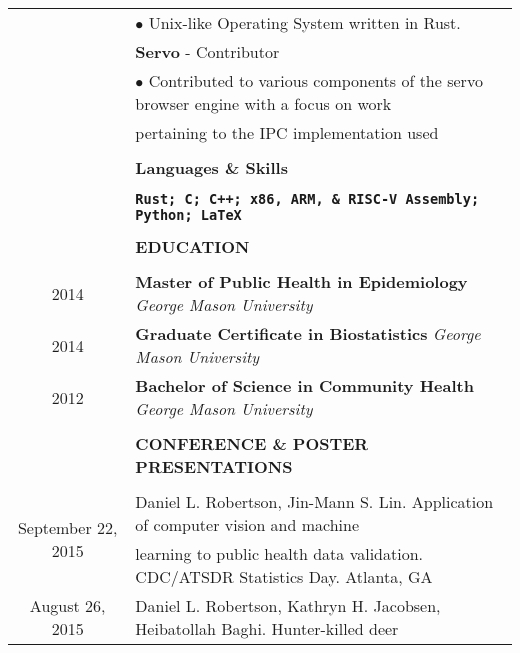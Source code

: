 \documentclass[10pt]{article}
\begin{document}
\begin{table}[ht]
\begin{tabular}{@{\hspace{0mm}}c@{\hspace{1mm}}c@{\hspace{3mm}}cl}
            & & & $\bullet$ Unix-like Operating System written in Rust.\\[2mm]
            & & & \textbf{Servo} - Contributor\\
            & & & $\bullet$ Contributed to various components of the servo browser engine with a focus on work\\
            & & & \hspace*{4mm}pertaining to the IPC implementation used\\[2mm]
            & & & \color{maroon}{\rule{14cm}{0.75pt}}\\
            & & & \large{\textbf{Languages \& Skills}}\\[-2mm]
            & & & \color{maroon}{\rule{14cm}{0.75pt}}\\
            \multicolumn{3}{c}{} & \textbf{\texttt{Rust; C; C++; x86, ARM, \& RISC-V Assembly; Python; \LaTeX}}\\[-1mm]
            & & & \color{maroon}{\rule{14cm}{0.75pt}}\\
            & & & \large{\textbf{EDUCATION}}\\[-2mm]
            & & & \color{maroon}{\rule{14cm}{0.75pt}}\\
            \multicolumn{3}{c}{2014} & \textbf{Master of Public Health in Epidemiology} \textit{George Mason University}\\[1mm]
            \multicolumn{3}{c}{2014} & \textbf{Graduate Certificate in Biostatistics} \textit{George Mason University}\\[1mm]
            \multicolumn{3}{c}{2012} & \textbf{Bachelor of Science in Community Health} \textit{George Mason University}\\[-1mm]
            & & & \color{maroon}{\rule{14cm}{0.75pt}}\\
            & & & \large{\textbf{CONFERENCE \& POSTER PRESENTATIONS}}\\[-2mm]
            & & & \color{maroon}{\rule{14cm}{0.75pt}}\\
            \multicolumn{3}{c}{\multirow{2}{*}{September 22, 2015}} & Daniel L. Robertson, Jin-Mann S. Lin. Application of computer vision and machine\\
            & & & learning to public health data validation. CDC/ATSDR Statistics Day. Atlanta, GA\\[2mm]
            \multicolumn{3}{c}{\multirow{4}{*}{August 26, 2015}} & Daniel L. Robertson, Kathryn H. Jacobsen, Heibatollah Baghi. Hunter-killed deer\\

\end{tabular}
\end{table}
\end{document}
